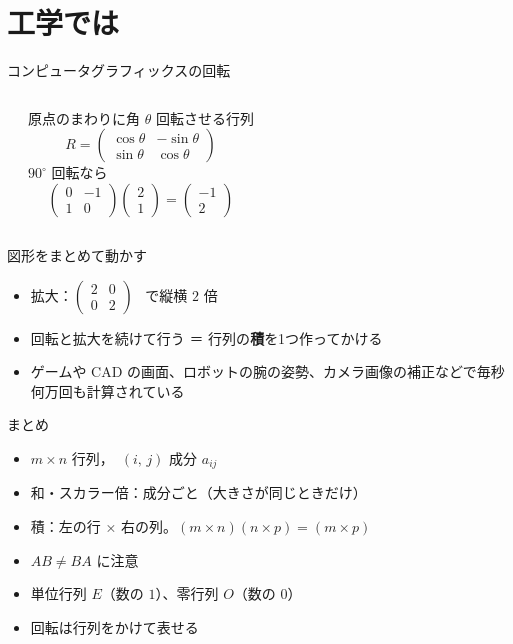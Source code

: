 \documentclass[aspectratio=169]{beamer}
\begin{document}
\section{工学では}

\begin{frame}{コンピュータグラフィックスの回転}
  \begin{columns}[c]
      \begin{center}
        
      \end{center}
      原点のまわりに角 $\theta$ 回転させる行列
      \[
        R = \begin{pmatrix} \cos\theta & -\sin\theta \\ \sin\theta & \cos\theta \end{pmatrix}
      \]
      $90^\circ$ 回転なら
      \[
        \begin{pmatrix} 0 & -1 \\ 1 & 0 \end{pmatrix}
        \begin{pmatrix} 2 \\ 1 \end{pmatrix}
        = \begin{pmatrix} -1 \\ 2 \end{pmatrix}
      \]
  \end{columns}
\end{frame}

\begin{frame}{図形をまとめて動かす}
  \medskip
  \begin{itemize}
    \item 拡大：$\begin{pmatrix} 2 & 0 \\ 0 & 2 \end{pmatrix}$ \ で縦横 $2$ 倍
    \item 回転と拡大を続けて行う ＝ 行列の\textbf{積}を1つ作ってかける
    \item ゲームや CAD の画面、ロボットの腕の姿勢、カメラ画像の補正などで毎秒何万回も計算されている
  \end{itemize}
\end{frame}

\begin{frame}{まとめ}
  \begin{itemize}
    \item $m \times n$ 行列，\ $(i,\,j)$ 成分 $a_{ij}$
    \item 和・スカラー倍：成分ごと（大きさが同じときだけ）
    \item 積：左の行 × 右の列。$(m \times n)(n \times p) = (m \times p)$
    \item $AB \neq BA$ に注意
    \item 単位行列 $E$（数の $1$）、零行列 $O$（数の $0$）
    \item 回転は行列をかけて表せる
  \end{itemize}
  \bigskip
\end{frame}
\end{document}
